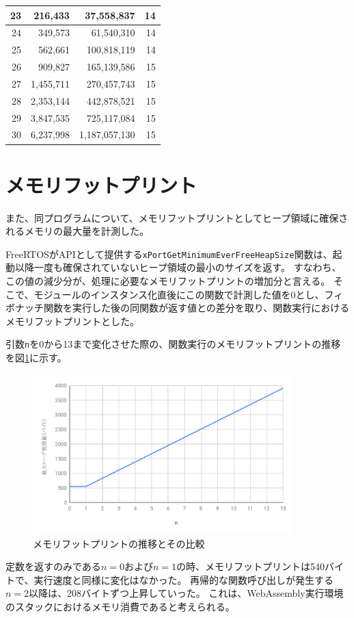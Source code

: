 \begin{table}[htbp]
\begin{center}
\begin{tabular}{|r|r|r|r|}
      23 & 216,433   & 37,558,837    & 14 \\ \hline
      24 & 349,573   & 61,540,310    & 14 \\ \hline
      25 & 562,661   & 100,818,119   & 14 \\ \hline
      26 & 909,827   & 165,139,586   & 15 \\ \hline
      27 & 1,455,711 & 270,457,743   & 15 \\ \hline
      28 & 2,353,144 & 442,878,521   & 15 \\ \hline
      29 & 3,847,535 & 725,117,084   & 15 \\ \hline
      30 & 6,237,998 & 1,187,057,130 & 15 \\ \hline
    \end{tabular}
  \end{center}
\end{table}

\section{メモリフットプリント}

また、同プログラムについて、メモリフットプリントとしてヒープ領域に確保されるメモリの最大量を計測した。

FreeRTOSがAPIとして提供する\verb|xPortGetMinimumEverFreeHeapSize|関数は、起動以降一度も確保されていないヒープ領域の最小のサイズを返す。
すなわち、この値の減少分が、処理に必要なメモリフットプリントの増加分と言える。
そこで、モジュールのインスタンス化直後にこの関数で計測した値を0とし、フィボナッチ関数を実行した後の同関数が返す値との差分を取り、関数実行におけるメモリフットプリントとした。

引数\verb|n|を0から13まで変化させた際の、関数実行のメモリフットプリントの推移を図\ref{fig:heap_size}に示す。

\begin{figure}[htbp]
  \caption{メモリフットプリントの推移とその比較}
  \label{fig:heap_size}
  \begin{center}
    \includegraphics[bb=0 0 600 370,width=10cm]{img/heap_size.pdf}
  \end{center}
\end{figure}

定数を返すのみである$n=0$および$n=1$の時、メモリフットプリントは540バイトで、実行速度と同様に変化はなかった。
再帰的な関数呼び出しが発生する$n=2$以降は、208バイトずつ上昇していった。
これは、WebAssembly実行環境のスタックにおけるメモリ消費であると考えられる。

